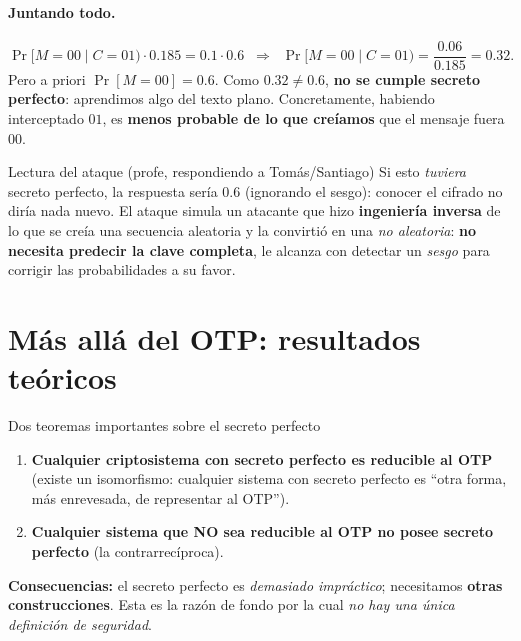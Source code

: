 \documentclass[11pt,a4paper]{article}
\begin{document}
\paragraph{Juntando todo.}
\[
  \Pr[M{=}00\mid C{=}01)\cdot 0.185 = 0.1\cdot 0.6
  \;\;\Longrightarrow\;\;
  \Pr[M{=}00\mid C{=}01) = \frac{0.06}{0.185} = \boxed{0.32}.
\]
Pero a priori $\Pr[M{=}00]=0.6$. Como $0.32\neq 0.6$, \textbf{no se cumple secreto
perfecto}: aprendimos algo del texto plano. Concretamente, habiendo interceptado $01$,
es \textbf{menos probable de lo que creíamos} que el mensaje fuera $00$.

\begin{practbox}{Lectura del ataque (profe, respondiendo a Tomás/Santiago)}
Si esto \emph{tuviera} secreto perfecto, la respuesta sería $0.6$ (ignorando el sesgo):
conocer el cifrado no diría nada nuevo. El ataque simula un atacante que hizo
\textbf{ingeniería inversa} de lo que se creía una secuencia aleatoria y la convirtió en
una \emph{no aleatoria}: \textbf{no necesita predecir la clave completa}, le alcanza con
detectar un \emph{sesgo} para corrigir las probabilidades a su favor.
\end{practbox}

\section{Más allá del OTP: resultados teóricos}

\begin{defbox}{Dos teoremas importantes sobre el secreto perfecto}
\begin{enumerate}[leftmargin=1.5em,itemsep=2pt]
  \item \textbf{Cualquier criptosistema con secreto perfecto es reducible al OTP}
        (existe un isomorfismo: cualquier sistema con secreto perfecto es ``otra forma,
        más enrevesada, de representar al OTP'').
  \item \textbf{Cualquier sistema que NO sea reducible al OTP no posee secreto perfecto}
        (la contrarrecíproca).
\end{enumerate}
\textbf{Consecuencias:} el secreto perfecto es \emph{demasiado impráctico}; necesitamos
\textbf{otras construcciones}. Esta es la razón de fondo por la cual \emph{no hay una
única definición de seguridad}.
\end{defbox}
\end{document}

